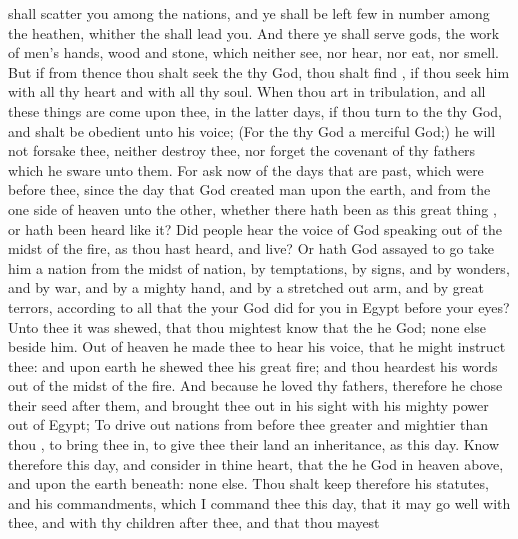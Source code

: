 {{} shall
scatter you among the
nations, and ye shall be
left
few in
number among the
heathen, whither the
{} shall
lead you.
And there ye shall
serve
gods, the
work of
men’s
hands,
wood and
stone, which neither
see, nor
hear, nor
eat, nor
smell.
But if from thence thou shalt
seek the
{} thy
God, thou shalt
find
{}, if thou
seek him with all thy
heart and with all thy
soul.
When thou art in
tribulation, and all these
things are
come upon thee,
{} in the
latter
days, if thou
turn to the
{} thy
God, and shalt be
obedient unto his
voice;
(For the
{} thy
God
{} a
merciful
God;) he will not
forsake thee, neither
destroy thee, nor
forget the
covenant of thy
fathers which he
sware unto them.
For
ask now of the
days that are
past, which
were
before thee, since the
day that
God
created
man upon the
earth, and
{} from the one
side of
heaven unto the other, whether there hath been
{} as this
great
thing
{}, or hath been
heard like it?
Did
{}
people
hear the
voice of
God speaking
out of the
midst of the
fire, as thou hast
heard, and
live?
Or hath
God
assayed to
go
{}
take him a
nation from the
midst of
{}
nation, by
temptations, by
signs, and by
wonders, and by
war, and by a
mighty
hand, and by a stretched
out
arm, and by
great
terrors, according to all that the
{} your
God
did for you in
Egypt before your
eyes?
Unto thee it was
shewed, that thou mightest
know that the
{} he
{}
God;
{} none
else beside
him.
Out of
heaven he made thee to
hear his
voice, that he might
instruct thee: and upon
earth he
shewed thee his
great
fire; and thou
heardest his
words out of the
midst of the
fire.
And because he
loved thy
fathers, therefore he
chose their
seed
after them, and brought thee
out in his
sight with his
mighty
power out of
Egypt;
To drive
out
nations from
before thee
greater and
mightier than thou
{}, to
bring thee in, to
give thee their
land
{} an
inheritance, as
{} this
day.
Know therefore this
day, and
consider
{} in thine
heart, that the
{} he
{}
God in
heaven
above, and upon the
earth beneath:
{} none else.
Thou shalt
keep therefore his
statutes, and his
commandments, which I
command thee this
day, that it may go
well with thee, and with thy
children
after thee, and that thou mayest
}
